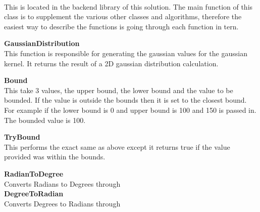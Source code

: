 \begin{FlushLeft}
    \begin{figure}[H]
        \centering
    \end{figure}\\

    This is located in the backend library of this solution. The main function of this class is to supplement the various other classes and algorithms, therefore the easiest way to describe the functions is going through each function in tern. \\ \bk

    \textbf{GaussianDistribution} \\ \bk
    This function is responsible for generating the gaussian values for the gaussian kernel. It returns the result of a 2D gaussian distribution calculation.\\\bk


    \textbf{Bound} \\ \bk
    This take 3 values, the upper bound, the lower bound and the value to be bounded. If the value is outside the bounds then it is set to the closest bound. For example if the lower bound is 0 and upper bound is 100 and 150 is passed in. The bounded value is 100.\\\bk

    \textbf{TryBound} \\ \bk
    This performs the exact same as above except it returns true if the value provided was within the bounds.\\\bk

    \textbf{RadianToDegree} \\ \bk
    Converts Radians to Degrees through \\\bk
    \textbf{DegreeToRadian} \\ \bk
    Converts Degrees to Radians through \\\bk


\end{FlushLeft}

